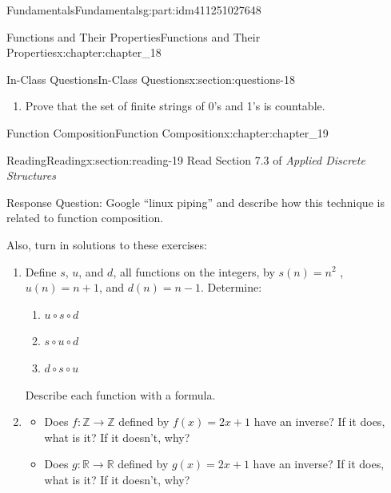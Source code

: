 \documentclass[oneside,10pt,]{book}
\numberwithin{equation}{section}
\begin{document}
\begin{partptx}{Fundamentals}{}{Fundamentals}{}{}{g:part:idm411251027648}
\begin{chapterptx}{Functions and Their Properties}{}{Functions and Their Properties}{}{}{x:chapter:chapter_18}
\begin{sectionptx}{In-Class Questions}{}{In-Class Questions}{}{}{x:section:questions-18}
\begin{enumerate}[label=\arabic*.]
\item{}Prove that the set of finite strings of 0's and 1's is countable.%
\end{enumerate}
%
\end{sectionptx}
\end{chapterptx}
%
\typeout{************************************************}
\typeout{************************************************}
%
\begin{chapterptx}{Function Composition}{}{Function Composition}{}{}{x:chapter:chapter_19}
%
%
%
\typeout{************************************************}
\typeout{************************************************}
%
\begin{sectionptx}{Reading}{}{Reading}{}{}{x:section:reading-19}
Read Section 7.3 of \emph{Applied Discrete Structures}%
\par
Response Question: Google ``linux piping'' and describe how this technique is related to function composition.%
\par
Also, turn in solutions to these exercises:%
\begin{enumerate}[label=\arabic*.]
\item{}Define \(s\), \(u\), and \(d\), all functions on the integers, by \(s(n) = n^2\) , \(u(n) = n + 1\), and \(d(n) = n-1\). Determine:%
\begin{enumerate}[label=(\alph*)]
\item{}\(u \circ  s \circ  d\)%
\item{}\(s \circ  u\circ  d\)%
\item{}\(d \circ  s \circ  u\)%
\end{enumerate}
Describe each function with a formula.%
\item{}%
\begin{itemize}[label=\textbullet]
\item{}Does \(f:\mathbb{Z} \rightarrow \mathbb{Z}\) defined by \(f(x)=2x+1\) have an inverse? If it does, what is it? If it doesn't, why?%
\item{}Does \(g:\mathbb{R} \rightarrow \mathbb{R}\) defined by \(g(x)=2x+1\) have an inverse? If it does, what is it? If it doesn't, why?%
\end{itemize}
%
\end{enumerate}
%
\end{sectionptx}
%
%
\typeout{************************************************}
\typeout{************************************************}

\end{chapterptx}
\end{partptx}
\end{document}
